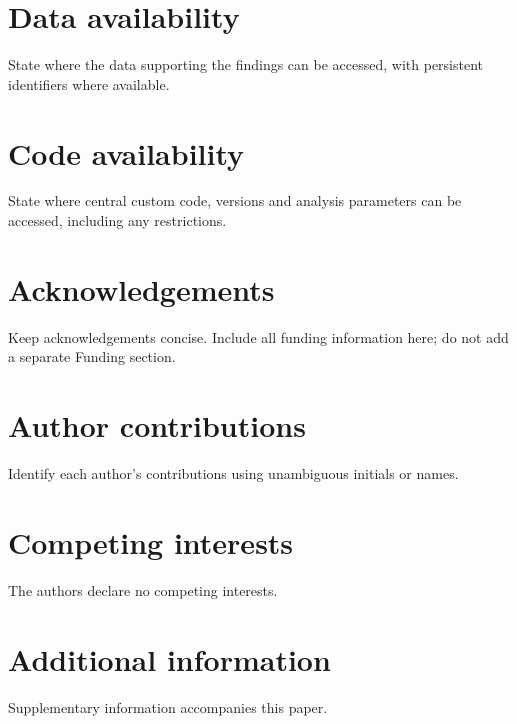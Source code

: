 \section*{Data availability}
State where the data supporting the findings can be accessed, with persistent identifiers where available.

\section*{Code availability}
State where central custom code, versions and analysis parameters can be accessed, including any restrictions.

\section*{Acknowledgements}
Keep acknowledgements concise. Include all funding information here; do not add a separate Funding section.

\section*{Author contributions}
Identify each author's contributions using unambiguous initials or names.

\section*{Competing interests}
The authors declare no competing interests.

\section*{Additional information}
Supplementary information accompanies this paper.
